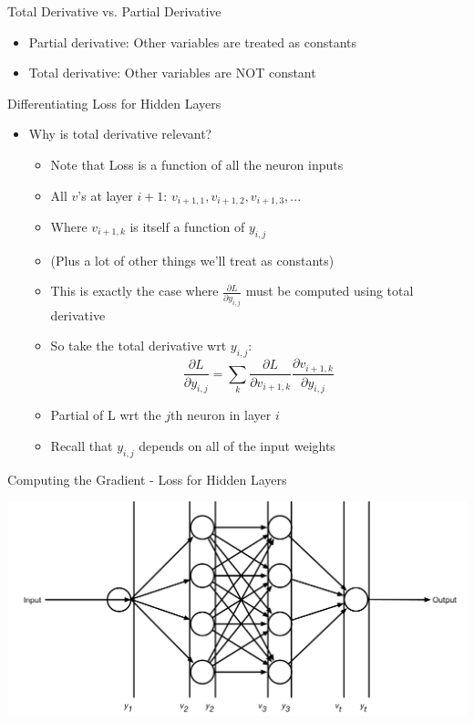 \documentclass[aspectratio=169]{beamer}
\begin{document}
\begin{frame}{Total Derivative vs. Partial Derivative}

\begin{itemize}
	\item Partial derivative: Other variables are treated as constants
	\item Total derivative: Other variables are NOT constant
\end{itemize}
\end{frame}
\begin{frame}{Differentiating Loss for Hidden Layers}

\begin{itemize} 
	\item Why is total derivative relevant?
	\begin{itemize}
	\item Note that Loss is a function of all the neuron inputs
	\item All $v$'s at layer $i+1$: $v_{i+1,1}, v_{i+1,2}, v_{i+1,3}, ...$
	\item Where $v_{i+1,k}$ is itself a function of $y_{i,j}$
	\item (Plus a lot of other things we'll treat as constants)
	\item This is exactly the case where $\frac{\partial L}{\partial y_{i,j}}$ must be computed using total
		derivative
	\item So take the total derivative wrt $y_{i,j}$:
		$$\frac{\partial L}{\partial y_{i,j}} = \sum_{k} \frac{\partial L}{\partial v_{i+1,k}}
			\frac{\partial  v_{i+1,k}}{\partial y_{i,j}}$$
	\item Partial of L wrt the $j$th neuron in layer $i$
	\item Recall that $y_{i,j}$ depends on all of the input weights
	\end{itemize}
\end{itemize}
\end{frame}
\begin{frame}{Computing the Gradient - Loss for Hidden Layers}

\includegraphics[width=1\textwidth]{lectBP/nnbpVs.pdf}
\end{frame}
\end{document}
